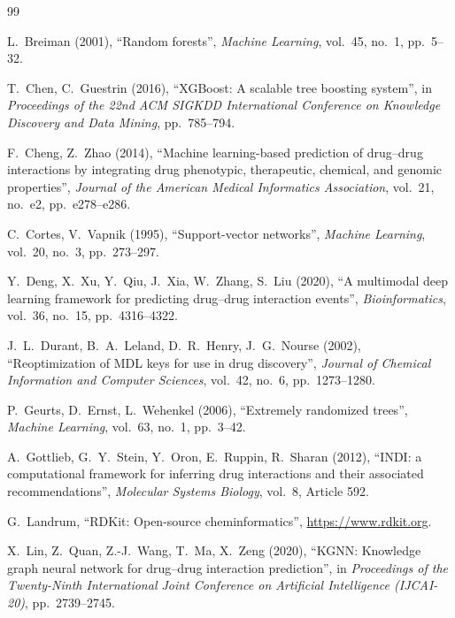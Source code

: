 \documentclass[12pt,a4paper,oneside]{report}
\begin{document}
\begin{thebibliography}{99}
\setlength{\itemsep}{2pt}

L.~Breiman (2001), ``Random forests'', \textit{Machine Learning}, vol.~45,
no.~1, pp.~5--32.

T.~Chen, C.~Guestrin (2016), ``XGBoost: A scalable tree boosting system'',
in \textit{Proceedings of the 22nd ACM SIGKDD International Conference on
Knowledge Discovery and Data Mining}, pp.~785--794.

F.~Cheng, Z.~Zhao (2014), ``Machine learning-based prediction of drug--drug
interactions by integrating drug phenotypic, therapeutic, chemical, and genomic
properties'', \textit{Journal of the American Medical Informatics Association},
vol.~21, no.~e2, pp.~e278--e286.

C.~Cortes, V.~Vapnik (1995), ``Support-vector networks'', \textit{Machine
Learning}, vol.~20, no.~3, pp.~273--297.

Y.~Deng, X.~Xu, Y.~Qiu, J.~Xia, W.~Zhang, S.~Liu (2020), ``A multimodal deep
learning framework for predicting drug--drug interaction events'',
\textit{Bioinformatics}, vol.~36, no.~15, pp.~4316--4322.

J.~L.~Durant, B.~A.~Leland, D.~R.~Henry, J.~G.~Nourse (2002), ``Reoptimization
of MDL keys for use in drug discovery'', \textit{Journal of Chemical Information
and Computer Sciences}, vol.~42, no.~6, pp.~1273--1280.

P.~Geurts, D.~Ernst, L.~Wehenkel (2006), ``Extremely randomized trees'',
\textit{Machine Learning}, vol.~63, no.~1, pp.~3--42.

A.~Gottlieb, G.~Y.~Stein, Y.~Oron, E.~Ruppin, R.~Sharan (2012), ``INDI: a
computational framework for inferring drug interactions and their associated
recommendations'', \textit{Molecular Systems Biology}, vol.~8, Article 592.

G.~Landrum, ``RDKit: Open-source cheminformatics'', \url{https://www.rdkit.org}.

X.~Lin, Z.~Quan, Z.-J.~Wang, T.~Ma, X.~Zeng (2020), ``KGNN: Knowledge graph
neural network for drug--drug interaction prediction'', in \textit{Proceedings
of the Twenty-Ninth International Joint Conference on Artificial Intelligence
(IJCAI-20)}, pp.~2739--2745.


\end{thebibliography}
\end{document}
